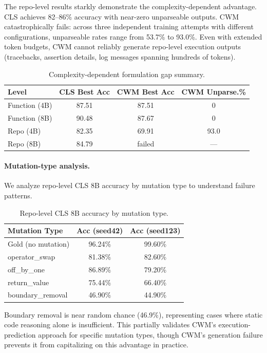 \documentclass[11pt,a4paper]{article}
\begin{document}
The repo-level results starkly demonstrate the complexity-dependent advantage. CLS achieves 82--86\% accuracy with near-zero unparseable outputs. CWM catastrophically fails: across three independent training attempts with different configurations, unparseable rates range from 53.7\% to 93.0\%. Even with extended token budgets, CWM cannot reliably generate repo-level execution outputs (tracebacks, assertion details, log messages spanning hundreds of tokens).

\begin{table}[h]
\centering
\caption{Complexity-dependent formulation gap summary.}
\label{tab:complexity}
\begin{tabular}{lccc}
\toprule
Level & CLS Best Acc & CWM Best Acc & CWM Unparse.\% \\
\midrule
Function (4B) & 87.51 & 87.51 & 0 \\
Function (8B) & 90.48 & 87.67 & 0 \\
Repo (4B) & 82.35 & 69.91 & 93.0 \\
Repo (8B) & 84.79 & failed & --- \\
\bottomrule
\end{tabular}
\end{table}

\paragraph{Mutation-type analysis.} We analyze repo-level CLS 8B accuracy by mutation type to understand failure patterns.

\begin{table}[h]
\centering
\caption{Repo-level CLS 8B accuracy by mutation type.}
\label{tab:mutation_repo}
\begin{tabular}{lcc}
\toprule
Mutation Type & Acc (seed42) & Acc (seed123) \\
\midrule
Gold (no mutation) & 96.24\% & 99.60\% \\
operator\_swap & 81.38\% & 82.60\% \\
off\_by\_one & 86.89\% & 79.20\% \\
return\_value & 75.44\% & 66.40\% \\
boundary\_removal & 46.90\% & 44.90\% \\
\bottomrule
\end{tabular}
\end{table}

Boundary removal is near random chance (46.9\%), representing cases where static code reasoning alone is insufficient. This partially validates CWM's execution-prediction approach for specific mutation types, though CWM's generation failure prevents it from capitalizing on this advantage in practice.
\end{document}
